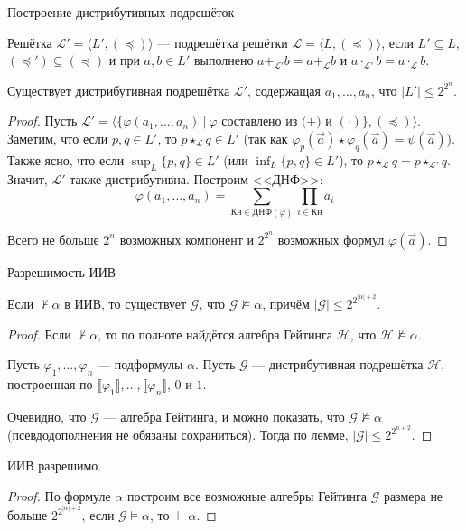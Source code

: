 \documentclass[aspectratio=169]{beamer}
\begin{document}
\begin{frame}{Построение дистрибутивных подрешёток}
\begin{defrus}Решётка $\mathcal{L'} = \langle L', (\preceq) \rangle$ --- подрешётка решётки $\mathcal{L} = \langle L, (\preceq) \rangle$, 
если $L' \subseteq L$, $(\preceq') \subseteq (\preceq)$ и 
при $a,b \in L'$ выполнено $a +_{\mathcal{L'}} b = a +_{\mathcal{L}} b$ и $a \cdot_{\mathcal{L'}} b = a \cdot_{\mathcal{L}} b$.
\end{defrus}
\begin{lemmarus}Существует дистрибутивная подрешётка $\mathcal{L'}$, содержащая
$a_1, \dots, a_n$, что $|L'| \le 2^{2^n}$.
\end{lemmarus}
\begin{proof}
Пусть $\mathcal{L'} = \langle\{ \varphi(a_1,\dots,a_n)\ |\ \varphi \text{ составлено из (+) и }(\cdot)\}, (\preceq)\rangle$.
Заметим, что если $p,q \in L'$, то $p \star_{\mathcal{L}} q \in L'$ 
(так как $\varphi_p(\overrightarrow{a})\star\varphi_q(\overrightarrow{a}) = \psi(\overrightarrow{a})$). Также ясно,
что если $\sup_L\{p,q\} \in L'$ (или $\inf_L\{p,q\} \in L'$), то $p \star_{\mathcal{L}} q = p \star_{\mathcal{L'}} q$.
Значит, $\mathcal{L'}$ также дистрибутивна. Построим <<ДНФ>>:
$$\varphi(a_1,\dots,a_n) = \sum_{\text{Кн} \in \text{ДНФ}(\varphi)}\prod_{i \in \text{Кн}}a_i$$

Всего не больше $2^n$ возможных компонент и $2^{2^n}$ возможных формул $\varphi(\overrightarrow{a})$.
\end{proof}
\end{frame}


\begin{frame}{Разрешимость ИИВ}
\begin{thmrus}Если $\not\vdash \alpha$ в ИИВ, то существует $\mathcal{G}$,
что $\mathcal{G} \not\models \alpha$, причём $|\mathcal{G}| \le 2^{2^{|\alpha|+2}}$.
\end{thmrus}
\begin{proof}Если $\not\vdash \alpha$, то по 
полноте найдётся алгебра Гейтинга $\mathcal{H}$, что
$\mathcal{H} \not\models \alpha$. 

Пусть $\varphi_1, \dots, \varphi_n$ --- подформулы $\alpha$.
Пусть $\mathcal{G}$ --- дистрибутивная подрешётка $\mathcal{H}$, 
построенная по $\llbracket \varphi_1 \rrbracket, \dots, \llbracket \varphi_n \rrbracket$, $0$ и $1$. 

Очевидно, что $\mathcal{G}$ --- алгебра Гейтинга, и можно показать, 
что $\mathcal{G} \not\models \alpha$ (псевдодополнения не обязаны сохраниться).
Тогда по лемме, $|\mathcal{G}| \le 2^{2^{n+2}}$. 
\end{proof}

\begin{thmrus}ИИВ разрешимо.
\end{thmrus}
\begin{proof}По формуле $\alpha$ построим все возможные алгебры Гейтинга $\mathcal{G}$ размера не больше $2^{2^{|\alpha|+2}}$,
если $\mathcal{G}\models\alpha$, то $\vdash\alpha$.
\end{proof}
\end{frame}
\end{document}
